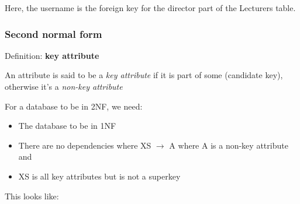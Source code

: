 \documentclass[11pt,a4paper,titlepage,dvipsnames,cmyk]{scrartcl}
\begin{document}
Here, the username is the foreign key for the director part of the
Lecturers table. 

\begin{minipage}{\textwidth}
\subsubsection{Second normal form}%
\label{ssub:2nf}

\begin{tcolorbox}
    Definition: \textbf{key attribute}

    \bigskip

    An attribute is said to be a \textit{key attribute} if it is part of
    some (candidate key), otherwise it's a \textit{non-key attribute} 
\end{tcolorbox}

\bigskip

For a database to be in 2NF, we need:
\begin{itemize}
    \item The database to be in 1NF
    \item There are no dependencies where XS $\rightarrow$ A where A is a
        non-key attribute and
    \item XS is all key attributes but is not a superkey
\end{itemize}
\end{minipage}

This looks like:
\end{document}
